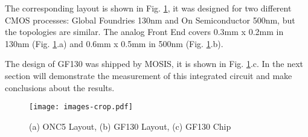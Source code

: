 The corresponding layout \cite{dali_man} is shown in Fig. \ref{fig:layout}, it was designed for two different CMOS processes: Global Foundries 130nm and On Semiconductor 500nm, but the topologies are similar. The analog Front End covers 0.3mm x 0.2mm in 130nm (Fig. \ref{fig:layout}.a) and 0.6mm x 0.5mm in 500nm (Fig. \ref{fig:layout}.b).

The design of GF130 was shipped by MOSIS, it is shown in Fig. \ref{fig:layout}.c. In the next section will demonstrate the measurement of this integrated circuit and make conclusions about the results.

\begin{figure}[h]
  \centering
  \texttt{[image: images-crop.pdf]}
  \caption{(a) ONC5 Layout, (b) GF130 Layout, (c) GF130 Chip}
  \label{fig:layout}
\end{figure}